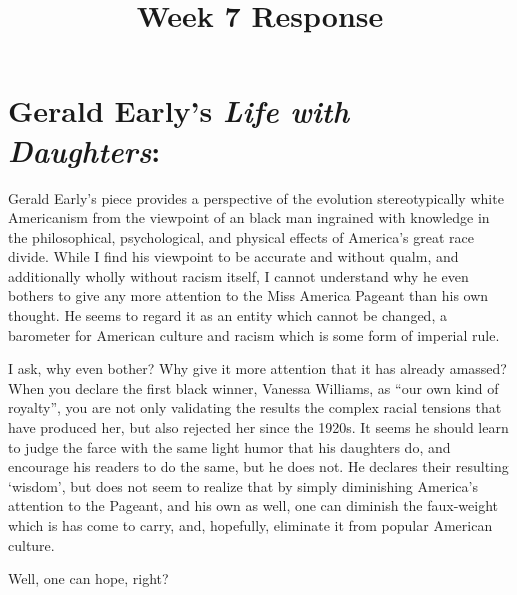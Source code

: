 \documentclass[letterpaper]{article}
\title{Week 7 Response}
\date{}
\begin{document}
	\maketitle
	\onehalfspacing
	\section{Gerald Early's \emph{Life with Daughters}:}
		Gerald Early's piece provides a perspective of the evolution stereotypically white Americanism from the viewpoint of an black man ingrained with knowledge in the philosophical, psychological, and physical effects of America's great race divide. While I find his viewpoint to be accurate and without qualm, and additionally wholly without racism itself, I cannot understand why he even bothers to give any more attention to the Miss America Pageant than his own thought. He seems to regard it as an entity which cannot be changed, a barometer for American culture and racism which is some form of imperial rule.

		I ask, why even bother? Why give it more attention that it has already amassed? When you declare the first black winner, Vanessa Williams, as ``our own kind of royalty'', you are not only validating the results the complex racial tensions that have produced her, but also rejected her since the 1920s. It seems he should learn to judge the farce with the same light humor that his daughters do, and encourage his readers to do the same, but he does not. He declares their resulting `wisdom', but does not seem to realize that by simply diminishing America's attention to the Pageant, and his own as well, one can diminish the faux-weight which is has come to carry, and, hopefully, eliminate it from popular American culture.

		Well, one can hope, right?

   
\end{document}
